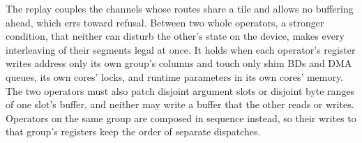 The replay couples the channels whose routes share a tile and allows no buffering ahead, which errs toward refusal.
Between two whole operators, a stronger condition, that neither can disturb the other's state on the device, makes every interleaving of their segments legal at once.
It holds when each operator's register writes address only its own group's columns and touch only shim BDs and DMA queues, its own cores' locks, and runtime parameters in its own cores' memory.
The two operators must also patch disjoint argument slots or disjoint byte ranges of one slot's buffer, and neither may write a buffer that the other reads or writes.
Operators on the same group are composed in sequence instead, so their writes to that group's registers keep the order of separate dispatches.

